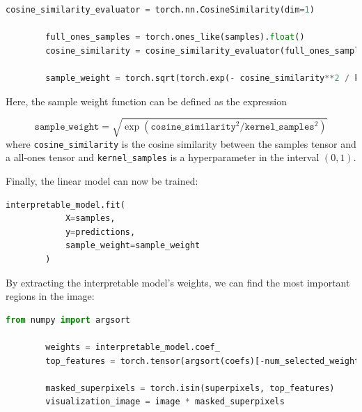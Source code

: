 \begin{program}
    \centering

    \begin{lstlisting}[language=Python, style=wider]
        cosine_similarity_evaluator = torch.nn.CosineSimilarity(dim=1)
        
        full_ones_samples = torch.ones_like(samples).float()
        cosine_similarity = cosine_similarity_evaluator(full_ones_samples, samples)
        
        sample_weight = torch.sqrt(torch.exp(- cosine_similarity**2 / kernel_samples**2))

    \end{lstlisting}
\end{program}

Here, the sample weight function can be defined as the expression 

\begin{equation}
    \texttt{sample\_weight} = \sqrt{\exp({\texttt{cosine\_similarity}^2 / \texttt{kernel\_samples}^2})}
    \label{eq:sample_weights_lime}
\end{equation}
where \texttt{cosine\_similarity} is the cosine similarity between the samples tensor and a all-ones tensor and \texttt{kernel\_samples} is a hyperparameter in the interval \((0, 1)\).

Finally, the linear model can now be trained:
\begin{program}
    \centering

    \begin{lstlisting}[language=Python, style=wider]
        interpretable_model.fit(
            X=samples,
            y=predictions,
            sample_weight=sample_weight
        )
    \end{lstlisting}
\end{program}

By extracting the interpretable model's weights, we can find the most important regions in the image:

\begin{program}
    \centering

    \begin{lstlisting}[language=Python, style=wider]
        from numpy import argsort

        weights = interpretable_model.coef_
        top_features = torch.tensor(argsort(coefs)[-num_selected_weights:])   # select top "num_selected_weights" weights
    
        masked_superpixels = torch.isin(superpixels, top_features)
        visualization_image = image * masked_superpixels
    \end{lstlisting}
\end{program}

